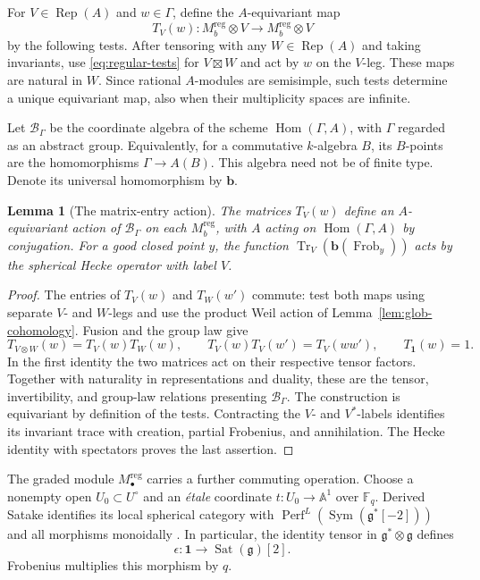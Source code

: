 \documentclass[11pt]{article}
\numberwithin{equation}{section}
\newtheorem{lemma}[theorem]{Lemma}
\theoremstyle{definition}
\theoremstyle{remark}
\newcommand{\F}{\mathbb F}
\newcommand{\g}{\mathfrak g}
\newcommand{\Frob}{\operatorname{Frob}}
\newcommand{\Hom}{\operatorname{Hom}}
\newcommand{\Rep}{\operatorname{Rep}}
\newcommand{\Perf}{\operatorname{Perf}}
\newcommand{\Sym}{\operatorname{Sym}}
\newcommand{\Sat}{\operatorname{Sat}}
\newcommand{\Tr}{\operatorname{Tr}}
\begin{document}
For $V\in\Rep(A)$ and $w\in\Gamma$, define the $A$-equivariant map
\[
 T_V(w):M_b^{\mathrm{reg}}\otimes V
                 \longrightarrow M_b^{\mathrm{reg}}\otimes V
\]
by the following tests.  After tensoring with any $W\in\Rep(A)$
and taking invariants, use \eqref{eq:regular-tests} for $V\boxtimes W$
and act by $w$ on the $V$-leg.  These maps are natural in $W$.
Since rational $A$-modules are semisimple, such tests determine a unique
equivariant map, also when their multiplicity spaces are infinite.

Let $\mathscr B_\Gamma$ be the coordinate algebra of the scheme
$\Hom(\Gamma,A)$, with $\Gamma$ regarded as an abstract group.
Equivalently, for a commutative $k$-algebra $B$, its $B$-points are
the homomorphisms $\Gamma\to A(B)$.  This algebra need not be of
finite type.  Denote its universal homomorphism by $\mathbf b$.

\begin{lemma}[The matrix-entry action]\label{lem:glob-matrices}
The matrices $T_V(w)$ define an $A$-equivariant action of
$\mathscr B_\Gamma$ on each $M_b^{\mathrm{reg}}$, with $A$ acting
on $\Hom(\Gamma,A)$ by conjugation.  For a good closed point $y$,
the function $\Tr_V(\mathbf b(\Frob_y))$ acts by the spherical
Hecke operator with label $V$.
\end{lemma}

\begin{proof}
The entries of $T_V(w)$ and $T_W(w')$ commute: test both maps using
separate $V$- and $W$-legs and use the product Weil action of
Lemma~\ref{lem:glob-cohomology}.  Fusion and the group law give
\[
 T_{V\otimes W}(w)=T_V(w)T_W(w),\qquad
 T_V(w)T_V(w')=T_V(ww'),\qquad T_{\mathbf1}(w)=1.
\]
In the first identity the two matrices act on their respective tensor
factors.  Together with naturality in representations and duality,
these are the tensor, invertibility, and group-law relations presenting
$\mathscr B_\Gamma$.  The construction is equivariant by definition
of the tests.  Contracting the $V$- and $V^*$-labels identifies its
invariant trace with creation, partial Frobenius, and annihilation.
The Hecke identity with spectators proves the last assertion.
\end{proof}

The graded module $M_\bullet^{\mathrm{reg}}$ carries a further
commuting operation.  Choose a nonempty open $U_0\subset U^\circ$
and an \emph{\'etale} coordinate $t:U_0\to\mathbb A^1$ over
$\F_q$.  Derived Satake identifies its local spherical category with
$\Perf^L(\Sym(\g^*[-2]))$ and all morphisms monoidally
\cite[Section~2, Theorem ``Derived Satake with Frobenius'']{Parent}.
In particular, the identity tensor in $\g^*\otimes\g$ defines
\begin{equation}\label{eq:degree-two}
 \epsilon:\mathbf1\longrightarrow\Sat(\g)[2].
\end{equation}
Frobenius multiplies this morphism by $q$.
\end{document}
